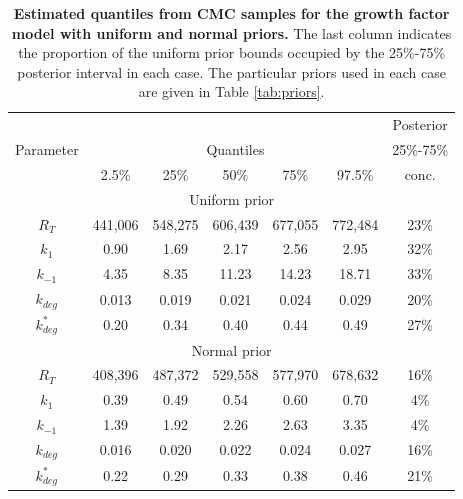 \begin{table}
\begin{tabular}{c|ccccc|c}
\toprule
&&&&&&                                         Posterior \\
Parameter &  \multicolumn{5}{c}{Quantiles} &   25\%-75\% \\
          & 2.5\% & 25\% & 50\% & 75\% & 97.5\% & conc.\\
\toprule
\multicolumn{7}{c}{Uniform prior} \\
\toprule
$R_T$       &  441,006 & 548,275 & 606,439 & 677,055 & 772,484 & 23\%\\
$k_1$       &  0.90 & 1.69 & 2.17 & 2.56 & 2.95 & 32\%\\
$k_{-1}$    & 4.35 & 8.35 & 11.23 & 14.23 & 18.71 & 33\%\\
$k_{deg}$   & 0.013 & 0.019 & 0.021 & 0.024 & 0.029 & 20\%\\
$k^*_{deg}$ & 0.20 & 0.34 & 0.40 & 0.44 & 0.49 & 27\%\\
\toprule
\multicolumn{7}{c}{Normal prior} \\
\toprule
$R_T$       & 408,396 & 487,372 & 529,558 & 577,970 & 678,632 & 16\%\\
$k_1$       & 0.39 & 0.49 & 0.54 & 0.60 & 0.70 & 4\%\\
$k_{-1}$    & 1.39 & 1.92 & 2.26 & 2.63 & 3.35 & 4\%\\
$k_{deg}$   & 0.016 & 0.020 & 0.022 & 0.024 & 0.027 & 16\%\\
$k^*_{deg}$ & 0.22 & 0.29 & 0.33 & 0.38 & 0.46 & 21\%\\
\end{tabular}
\caption{\textbf{Estimated quantiles from CMC samples for the growth factor model with uniform and normal priors.} The last column indicates the proportion of the uniform prior bounds occupied by the 25\%-75\% posterior interval in each case. The particular priors used in each case are given in Table \ref{tab:priors}.}
\label{tab:growth_factor_results}
\end{table}

